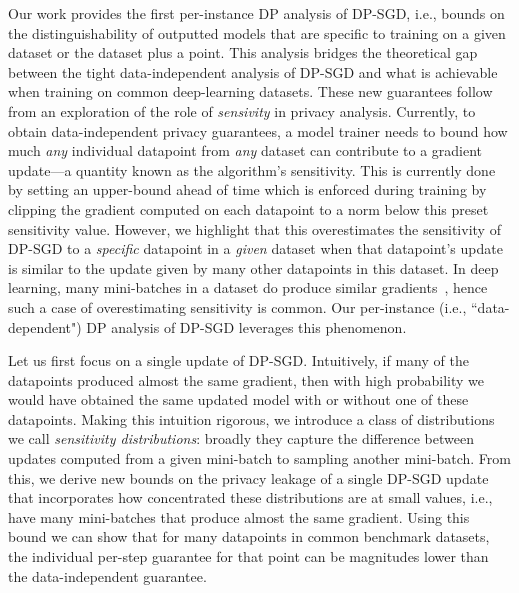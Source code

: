 Our work provides the first per-instance DP analysis of DP-SGD, i.e., bounds on the distinguishability of outputted models that are specific to training on a given dataset or the dataset plus a point. This analysis bridges the theoretical gap between the tight data-independent analysis of DP-SGD and what is achievable when training on common deep-learning datasets. %
These new guarantees follow from an exploration of the role of \textit{sensivity} in privacy analysis. Currently, to obtain data-independent privacy guarantees, a model trainer needs to bound how much \emph{any} individual datapoint from \textit{any} dataset can contribute to a gradient update---a quantity known as the algorithm's sensitivity. This is currently done by setting an upper-bound ahead of time which is enforced during training by clipping the gradient computed on each datapoint %
to a norm below this preset sensitivity value. However, we highlight that this overestimates the sensitivity of DP-SGD to a \emph{specific} datapoint in a \textit{given} dataset when that datapoint's update is similar to the update given by many other datapoints in this dataset. In deep learning, many mini-batches in a dataset do produce similar gradients~\citep{shumailov2021dataorder, thudi2022necessity, kong2022forgeability}, hence such a case of overestimating sensitivity is common. Our per-instance (i.e., ``data-dependent") DP analysis of DP-SGD leverages this phenomenon.














Let us first focus on a single update of DP-SGD. Intuitively, if many of the datapoints produced almost the same gradient, then with high probability we would have obtained the same updated model with or without one of these datapoints. Making this intuition rigorous, we introduce a class of distributions we call \textit{sensitivity distributions}: broadly they capture the difference between updates computed from a given mini-batch to sampling another mini-batch. From this, we derive new bounds on the privacy leakage of a single DP-SGD update that incorporates how concentrated these distributions are at small values, i.e., have many mini-batches that produce almost the same gradient. Using this bound we can show that for many datapoints in common benchmark datasets, the individual per-step guarantee for that point can be magnitudes lower than the data-independent guarantee. 





